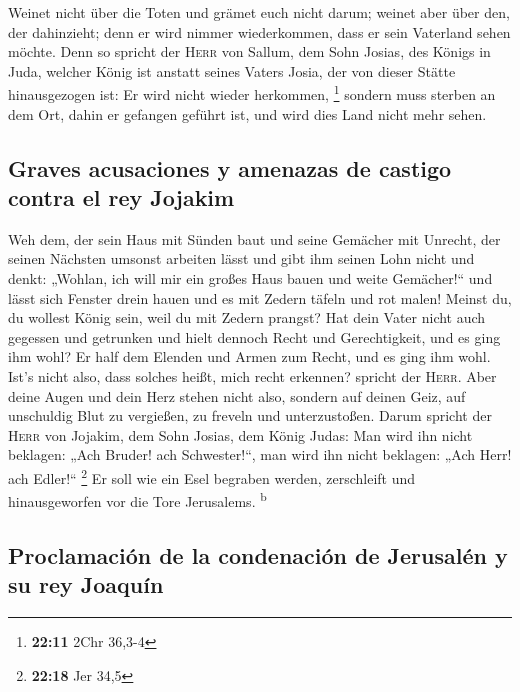  Weinet nicht über die Toten und grämet euch nicht darum;
weinet aber über den, der dahinzieht; denn er wird nimmer wiederkommen,
dass er sein Vaterland sehen möchte.  Denn so spricht der
\textsc{Herr} von Sallum, dem Sohn Josias, des Königs in Juda, welcher
König ist anstatt seines Vaters Josia, der von dieser Stätte
hinausgezogen ist: Er wird nicht wieder herkommen, \footnote{\textbf{22:11}
  2Chr 36,3-4}  sondern muss sterben an dem Ort, dahin er
gefangen geführt ist, und wird dies Land nicht mehr sehen.

\hypertarget{graves-acusaciones-y-amenazas-de-castigo-contra-el-rey-jojakim}{%
\subsection{Graves acusaciones y amenazas de castigo contra el rey
Jojakim}\label{graves-acusaciones-y-amenazas-de-castigo-contra-el-rey-jojakim}}

 Weh dem, der sein Haus mit Sünden baut und seine
Gemächer mit Unrecht, der seinen Nächsten umsonst arbeiten lässt und
gibt ihm seinen Lohn nicht  und denkt: „Wohlan, ich will
mir ein großes Haus bauen und weite Gemächer!{}`` und lässt sich Fenster
drein hauen und es mit Zedern täfeln und rot malen! 
Meinst du, du wollest König sein, weil du mit Zedern prangst? Hat dein
Vater nicht auch gegessen und getrunken und hielt dennoch Recht und
Gerechtigkeit, und es ging ihm wohl?  Er half dem Elenden
und Armen zum Recht, und es ging ihm wohl. Ist's nicht also, dass
solches heißt, mich recht erkennen? spricht der \textsc{Herr}.
 Aber deine Augen und dein Herz stehen nicht also,
sondern auf deinen Geiz, auf unschuldig Blut zu vergießen, zu freveln
und unterzustoßen.  Darum spricht der \textsc{Herr} von
Jojakim, dem Sohn Josias, dem König Judas: Man wird ihn nicht beklagen:
„Ach Bruder! ach Schwester!{}``, man wird ihn nicht beklagen: „Ach Herr!
ach Edler!{}`` \footnote{\textbf{22:18} Jer 34,5}  Er
soll wie ein Esel begraben werden, zerschleift und hinausgeworfen vor
die Tore Jerusalems. \textsuperscript{b}

\hypertarget{proclamaciuxf3n-de-la-condenaciuxf3n-de-jerusaluxe9n-y-su-rey-joaquuxedn}{%
\subsection{Proclamación de la condenación de Jerusalén y su rey
Joaquín}\label{proclamaciuxf3n-de-la-condenaciuxf3n-de-jerusaluxe9n-y-su-rey-joaquuxedn}}

